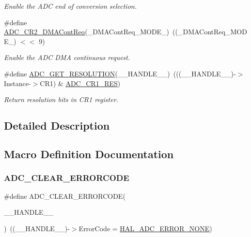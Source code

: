 \begin{DoxyCompactItemize}
\begin{DoxyCompactList}\small\item\em Enable the A\+DC end of conversion selection. \end{DoxyCompactList}\item 
\#define \mbox{\hyperlink{group___a_d_c___private___macros_ga93bf2d0e4b9f98b83ee48be918e9c940}{A\+D\+C\+\_\+\+C\+R2\+\_\+\+D\+M\+A\+Cont\+Req}}(\+\_\+\+D\+M\+A\+Cont\+Req\+\_\+\+M\+O\+D\+E\+\_\+)~((\+\_\+\+D\+M\+A\+Cont\+Req\+\_\+\+M\+O\+D\+E\+\_\+) $<$$<$ 9)
\begin{DoxyCompactList}\small\item\em Enable the A\+DC D\+MA continuous request. \end{DoxyCompactList}\item 
\#define \mbox{\hyperlink{group___a_d_c___private___macros_gae2da95074db4dd0418c1dd1f13ad7970}{A\+D\+C\+\_\+\+G\+E\+T\+\_\+\+R\+E\+S\+O\+L\+U\+T\+I\+ON}}(\+\_\+\+\_\+\+H\+A\+N\+D\+L\+E\+\_\+\+\_\+)~(((\+\_\+\+\_\+\+H\+A\+N\+D\+L\+E\+\_\+\+\_\+)-\/$>$Instance-\/$>$C\+R1) \& \mbox{\hyperlink{group___peripheral___registers___bits___definition_ga71e4a4c233895a2e7b6dd3ca6ca849e5}{A\+D\+C\+\_\+\+C\+R1\+\_\+\+R\+ES}})
\begin{DoxyCompactList}\small\item\em Return resolution bits in C\+R1 register. \end{DoxyCompactList}\end{DoxyCompactItemize}


\subsection{Detailed Description}


\subsection{Macro Definition Documentation}
\mbox{\label{group___a_d_c___private___macros_gac7ab87a3ab932eed1b3ac5faad4e3aa9}} 
\subsubsection{\texorpdfstring{ADC\_CLEAR\_ERRORCODE}{ADC\_CLEAR\_ERRORCODE}}
{\footnotesize\ttfamily \#define A\+D\+C\+\_\+\+C\+L\+E\+A\+R\+\_\+\+E\+R\+R\+O\+R\+C\+O\+DE(\begin{DoxyParamCaption}\item[{}]{\+\_\+\+\_\+\+H\+A\+N\+D\+L\+E\+\_\+\+\_\+ }\end{DoxyParamCaption})~((\+\_\+\+\_\+\+H\+A\+N\+D\+L\+E\+\_\+\+\_\+)-\/$>$Error\+Code = \mbox{\hyperlink{group___a_d_c___error___code_ga93b4576d46ee0f8c53b7d69f39778e38}{H\+A\+L\+\_\+\+A\+D\+C\+\_\+\+E\+R\+R\+O\+R\+\_\+\+N\+O\+NE}})}



